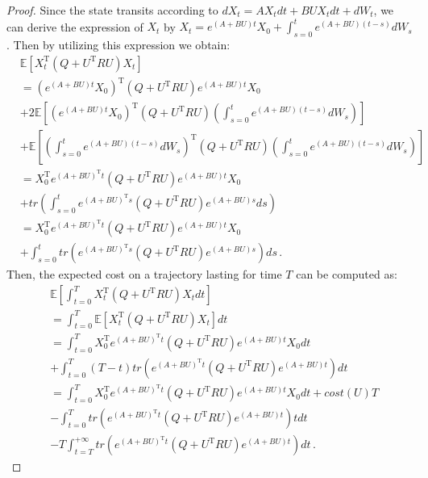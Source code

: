 \documentclass{article}
\theoremstyle{definition}
\begin{document}
\begin{proof}
Since the state transits according to $dX_{t}=AX_{t}dt+BUX_{t}dt+dW_{t}$, we can derive the expression of $X_{t}$ by    $X_{t}=e^{(A+BU)t}X_{0}+\int_{s=0}^{t}e^{(A+BU)(t-s)}dW_{s}$. Then by utilizing this expression we obtain:
\begin{align*}
&\mathbb{E}\left[X^{\mathrm{T}}_{t}(Q+U^{\mathrm{T}}RU)X_{t}\right]\\
&=(e^{(A+BU)t}X_{0})^{\mathrm{T}}(Q+U^{\mathrm{T}}RU)e^{(A+BU)t}X_{0}\\
&+2\mathbb{E}\left[(e^{(A+BU)t}X_{0})^{\mathrm{T}}(Q+U^{\mathrm{T}}RU)\left(\int_{s=0}^{t}e^{(A+BU)(t-s)}dW_{s}\right)\right]\\
&+\mathbb{E}\left[\left(\int_{s=0}^{t}e^{(A+BU)(t-s)}dW_{s}\right)^{\mathrm{T}}(Q+U^{\mathrm{T}}RU)\left(\int_{s=0}^{t}e^{(A+BU)(t-s)}dW_{s}\right)\right]\\
&=X_{0}^{\mathrm{T}}e^{(A+BU)^{\mathrm{T}}t}(Q+U^{\mathrm{T}}RU)e^{(A+BU)t}X_{0}\\
&+tr\left(\int_{s=0}^{t}e^{(A+BU)^{\mathrm{T}}s}(Q+U^{\mathrm{T}}RU)e^{(A+BU)s}ds\right)\\
&=X_{0}^{\mathrm{T}}e^{(A+BU)^{\mathrm{T}}t}(Q+U^{\mathrm{T}}RU)e^{(A+BU)t}X_{0}\\
&+\int_{s=0}^{t}tr\left(e^{(A+BU)^{\mathrm{T}}s}(Q+U^{\mathrm{T}}RU)e^{(A+BU)s}\right)ds\,.
\end{align*}
Then, the expected cost on a trajectory lasting for time $T$ can be computed as:
\begin{align*}
&\mathbb{E}\left[\int_{t=0}^{T}X_t^{\mathrm{T}}(Q+U^{\mathrm{T}}RU)X_{t}dt\right]\\
&=\int_{t=0}^{T}\mathbb{E}\left[X_t^{\mathrm{T}}(Q+U^{\mathrm{T}}RU)X_{t}\right]dt\\
&=\int_{t=0}^{T}X_{0}^{\mathrm{T}}e^{(A+BU)^{\mathrm{T}}t}(Q+U^{\mathrm{T}}RU)e^{(A+BU)t}X_{0}dt\\
&+\int_{t=0}^{T}(T-t)tr\left(e^{(A+BU)^{\mathrm{T}}t}(Q+U^{\mathrm{T}}RU)e^{(A+BU)t}\right)dt\\
&=\int_{t=0}^{T}X_{0}^{\mathrm{T}}e^{(A+BU)^{\mathrm{T}}t}(Q+U^{\mathrm{T}}RU)e^{(A+BU)t}X_{0}dt+cost(U)T\\
&-\int_{t=0}^{T}tr\left(e^{(A+BU)^{\mathrm{T}}t}(Q+U^{\mathrm{T}}RU)e^{(A+BU)t}\right)tdt\\
&-T\int_{t=T}^{+\infty}tr\left(e^{(A+BU)^{\mathrm{T}}t}(Q+U^{\mathrm{T}}RU)e^{(A+BU)t}\right)dt\,.
\end{align*}

\end{proof}
\end{document}
